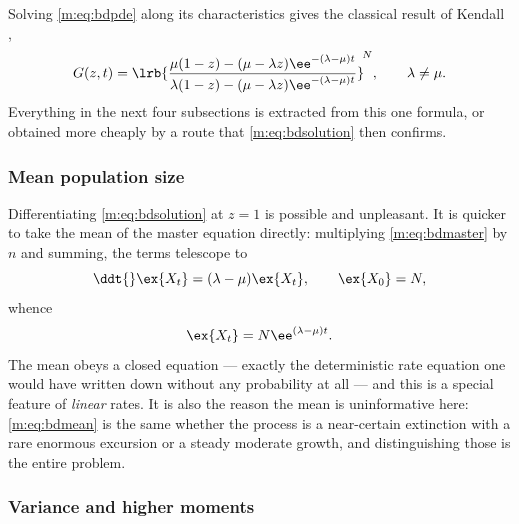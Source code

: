 Solving \cref{m:eq:bdpde} along its characteristics gives the classical result of
Kendall \cite{Kendall1948},
\begin{equation}
\label{m:eq:bdsolution}
G(z,t) = \lrb{\frac{\mu(1-z)-(\mu-\lambda z)\ee^{-(\lambda-\mu)t}}
{\lambda(1-z)-(\mu-\lambda z)\ee^{-(\lambda-\mu)t}}}^{\!N},
\qquad\lambda\neq\mu .
\end{equation}
Everything in the next four subsections is extracted from this one formula, or
obtained more cheaply by a route that \cref{m:eq:bdsolution} then confirms.

\subsubsection{Mean population size}
\label{m:sec:mean}

Differentiating \cref{m:eq:bdsolution} at $z=1$ is possible and unpleasant. It is
quicker to take the mean of the master equation directly: multiplying
\cref{m:eq:bdmaster} by $n$ and summing, the terms telescope to
\begin{equation}
\label{m:eq:meanode}
\ddt{}\ex{X_t} = (\lambda-\mu)\ex{X_t},
\qquad
\ex{X_0}=N,
\end{equation}
whence
\begin{equation}
\label{m:eq:bdmean}
\ex{X_t} = N\ee^{(\lambda-\mu)t} .
\end{equation}
The mean obeys a closed equation --- exactly the deterministic rate equation one
would have written down without any probability at all --- and this is a special
feature of \emph{linear} rates. It is also the reason the mean is uninformative
here: \cref{m:eq:bdmean} is the same whether the process is a near-certain
extinction with a rare enormous excursion or a steady moderate growth, and
distinguishing those is the entire problem.

\subsubsection{Variance and higher moments}
\label{m:sec:variance}

